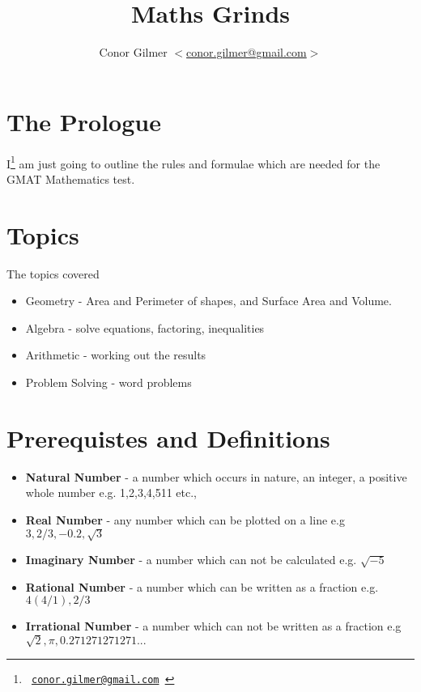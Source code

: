 \documentclass{article}
\title{\gmat{} Maths Grinds}
\author{Conor Gilmer $<$\href{mailto:conor.gilmer@gmail.com}{conor.gilmer@gmail.com}$>$}
\newcommand{\email}[1]{\texttt{#1}}
\begin{document}
\pagestyle{headings}
\maketitle

\tableofcontents


\newpage
\section{The Prologue}
I\footnote{\email{ \href{mailto:conor.gilmer@gmail.com.com}{conor.gilmer@gmail.com} }} am just going to outline the rules and formulae which are needed for the GMAT Mathematics test.

\section{Topics}

The topics covered

\begin{itemize}
\item Geometry - Area and Perimeter of shapes, and Surface Area and Volume.
\item Algebra - solve equations, factoring, inequalities
\item Arithmetic - working out the results
\item Problem Solving - word problems
\end{itemize}


\newpage
\section{Prerequistes and Definitions}
\begin{itemize}
\item \textbf{Natural Number} - a number which occurs in nature, an integer, a positive whole number e.g. 1,2,3,4,511 etc.,
\item \textbf{Real Number} - any number which can be plotted on a line e.g $3, 2/3, -0.2, \sqrt{3}$
\item \textbf{Imaginary Number} - a number which can not be calculated e.g. $\sqrt{-5}$
\item \textbf{Rational Number} - a number which can be written as a fraction e.g. $4 (4/1) , 2/3$
\item \textbf{Irrational Number} - a number which can not be written as a fraction e.g $\sqrt{2}, \pi, 0.271271271271...$
\end{itemize}
\end{document}
